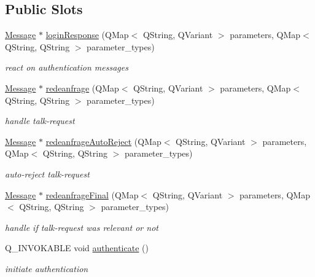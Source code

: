 \subsection*{Public Slots}
\begin{DoxyCompactItemize}
\item 
\hyperlink{class_message}{Message} $\ast$ \hyperlink{class_master_client_aee4f8e2661193dc116e43292ed3da060}{login\+Response} (Q\+Map$<$ Q\+String, Q\+Variant $>$ parameters, Q\+Map$<$ Q\+String, Q\+String $>$ parameter\+\_\+types)
\begin{DoxyCompactList}\small\item\em react on authentication messages \end{DoxyCompactList}\item 
\hyperlink{class_message}{Message} $\ast$ \hyperlink{class_master_client_ab6be0a3ee65665bac5ca1275a7ae7f8f}{redeanfrage} (Q\+Map$<$ Q\+String, Q\+Variant $>$ parameters, Q\+Map$<$ Q\+String, Q\+String $>$ parameter\+\_\+types)
\begin{DoxyCompactList}\small\item\em handle talk-\/request \end{DoxyCompactList}\item 
\hyperlink{class_message}{Message} $\ast$ \hyperlink{class_master_client_a68225aefe109a93cdcb61b3f165b0848}{redeanfrage\+Auto\+Reject} (Q\+Map$<$ Q\+String, Q\+Variant $>$ parameters, Q\+Map$<$ Q\+String, Q\+String $>$ parameter\+\_\+types)
\begin{DoxyCompactList}\small\item\em auto-\/reject talk-\/request \end{DoxyCompactList}\item 
\hyperlink{class_message}{Message} $\ast$ \hyperlink{class_master_client_aae06ba84b80df2b6ab7f3ea465b5a006}{redeanfrage\+Final} (Q\+Map$<$ Q\+String, Q\+Variant $>$ parameters, Q\+Map$<$ Q\+String, Q\+String $>$ parameter\+\_\+types)
\begin{DoxyCompactList}\small\item\em handle if talk-\/request was relevant or not \end{DoxyCompactList}\item 
Q\+\_\+\+I\+N\+V\+O\+K\+A\+B\+L\+E void \hyperlink{class_master_client_a11198e43a00389af5fafffa316d1ac3d}{authenticate} ()
\begin{DoxyCompactList}\small\item\em initiate authentication \end{DoxyCompactList}\item 

\end{DoxyCompactItemize}
